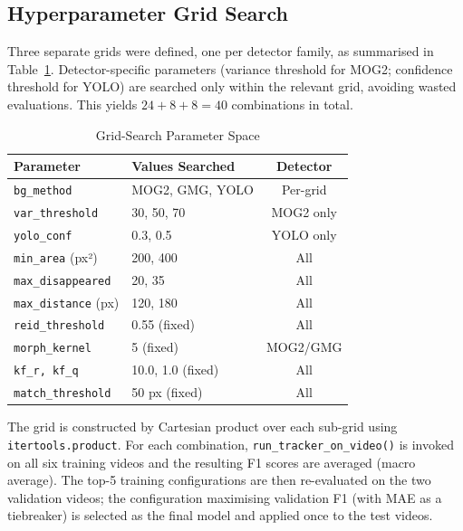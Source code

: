 \documentclass[10pt, conference, compsocconf]{IEEEtran}
\begin{document}
\subsection{Hyperparameter Grid Search}
Three separate grids were defined, one per detector family, as
summarised in Table~\ref{tab:grid}. Detector-specific parameters
(variance threshold for MOG2; confidence threshold for YOLO) are
searched only within the relevant grid, avoiding wasted evaluations.
This yields $24 + 8 + 8 = 40$ combinations in total.

\begin{table}[!t]
\caption{Grid-Search Parameter Space}
\label{tab:grid}
\centering
\footnotesize
\setlength{\tabcolsep}{3pt}
\begin{tabular}{llc}
\toprule
\textbf{Parameter} & \textbf{Values Searched} & \textbf{Detector} \\
\midrule
\texttt{bg\_method}       & MOG2, GMG, YOLO      & Per-grid \\
\texttt{var\_threshold}   & 30, 50, 70           & MOG2 only \\
\texttt{yolo\_conf}       & 0.3, 0.5             & YOLO only \\
\texttt{min\_area} (px²)  & 200, 400             & All \\
\texttt{max\_disappeared} & 20, 35               & All \\
\texttt{max\_distance} (px) & 120, 180           & All \\
\texttt{reid\_threshold}  & 0.55 (fixed)         & All \\
\texttt{morph\_kernel}    & 5 (fixed)            & MOG2/GMG \\
\texttt{kf\_r, kf\_q}     & 10.0, 1.0 (fixed)   & All \\
\texttt{match\_threshold} & 50 px (fixed)        & All \\
\bottomrule
\end{tabular}
\end{table}

The grid is constructed by Cartesian product over each sub-grid
using \texttt{itertools.product}. For each combination,
\texttt{run\_tracker\_on\_video()} is invoked on all six training
videos and the resulting F1 scores are averaged (macro average).
The top-5 training configurations are then re-evaluated on the two
validation videos; the configuration maximising validation F1
(with MAE as a tiebreaker) is selected as the final model and applied
once to the test videos.
\end{document}
